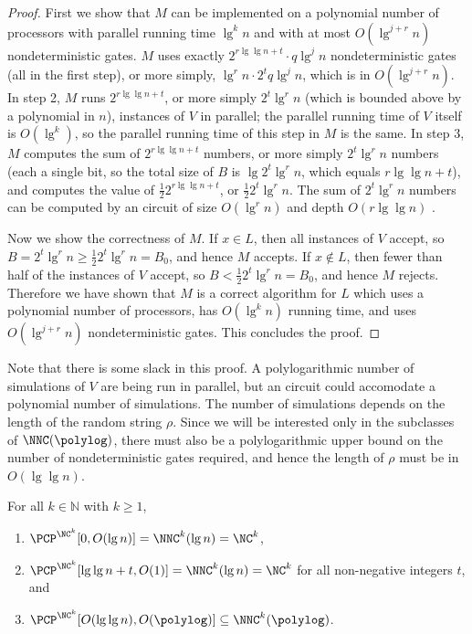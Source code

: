 \documentclass{article}
\begin{document}
\begin{proof}
  First we show that $M$ can be implemented on a polynomial number of processors with parallel running time $\lg^k n$ and with at most $O(\lg^{j + r} n)$ nondeterministic gates.
  $M$ uses exactly $2^{r \lg \lg n + t}\cdot q \lg^j n$ nondeterministic gates (all in the first step), or more simply, $\lg^r n \cdot 2^t q \lg^j n$, which is in $O(\lg^{j + r} n)$.
  In step 2, $M$ runs $2^{r \lg \lg n + t}$, or more simply $2^t \lg^r n$ (which is bounded above by a polynomial in $n$), instances of $V$ in parallel; the parallel running time of $V$ itself is $O(\lg^k)$, so the parallel running time of this step in $M$ is the same.
  In step 3, $M$ computes the sum of $2^{r \lg \lg n + t}$ numbers, or more simply $2^t \lg^r n$ numbers (each a single bit, so the total size of $B$ is $\lg 2^t \lg^r n$, which equals $r \lg \lg n + t$), and computes the value of $\frac{1}{2} 2^{r \lg \lg n + t}$, or $\frac{1}{2} 2^t \lg^r n$.
  The sum of $2^t \lg^r n$ numbers can be computed by an \NC{} circuit of size $O(\lg^r n)$ and depth $O(r \lg \lg n)$ \cite[Theorem~2.6.1]{savage98}.

  Now we show the correctness of $M$.
  If $x \in L$, then all instances of $V$ accept, so $B = 2^t \lg^r n \geq \frac{1}{2} 2^t \lg^r n = B_0$, and hence $M$ accepts.
  If $x \notin L$, then fewer than half of the instances of $V$ accept, so $B < \frac{1}{2} 2^t \lg^r n = B_0$, and hence $M$ rejects.
  Therefore we have shown that $M$ is a correct algorithm for $L$ which uses a polynomial number of processors, has $O(\lg^k n)$ running time, and uses $O(\lg^{j + r} n)$ nondeterministic gates.
  This concludes the proof.
\end{proof}

Note that there is some slack in this proof.
A polylogarithmic number of simulations of $V$ are being run in parallel, but an \NNC{} circuit could accomodate a polynomial number of simulations.
The number of simulations depends on the length of the random string $\rho$.
Since we will be interested only in the subclasses of $\NNC(\polylog)$, there must also be a polylogarithmic upper bound on the number of nondeterministic gates required, and hence the length of $\rho$ must be in $O(\lg \lg n)$.

\begin{corollary}\label{cor:pcpinnnck}
  For all $k \in \mathbb{N}$ with $k \geq 1$,
  \begin{enumerate}
  \item $\PCP^{\NC^k}[0, O(\lg n)] = \NNC^k(\lg n) = \NC^k$,
  \item $\PCP^{\NC^k}[\lg \lg n + t, O(1)] = \NNC^k(\lg n) = \NC^k$ for all non-negative integers $t$, and
  \item $\PCP^{\NC^k}[O(\lg \lg n), O(\polylog)] \subseteq \NNC^k(\polylog)$.
  \end{enumerate}
\end{corollary}
\end{document}

